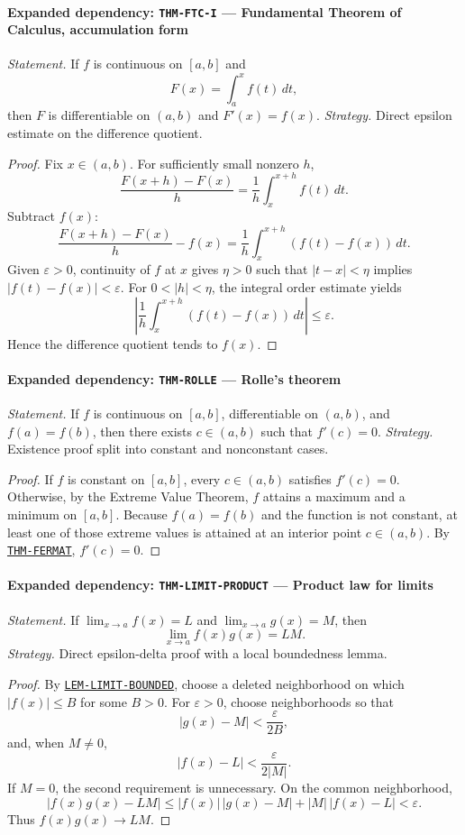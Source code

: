 \documentclass[10pt]{article}
\newcommand{\pidraw}[1]{\begingroup\urlstyle{tt}\nolinkurl{#1}\endgroup}
\newcommand{\pidref}[1]{\hyperref[prf:#1]{\pidraw{#1}}}
\newcommand{\pid}[1]{\pidref{#1}}
\theoremstyle{definition}
\theoremstyle{remark}
\begin{document}
\paragraph{Expanded dependency: \pidraw{THM-FTC-I} --- Fundamental Theorem of Calculus, accumulation form}
\textit{Statement.} If $f$ is continuous on $[a,b]$ and
\[
F(x)=\int_a^x f(t)\,dt,
\]
then $F$ is differentiable on $(a,b)$ and $F'(x)=f(x)$.
\textit{Strategy.} Direct epsilon estimate on the difference quotient.
\begin{proof}Fix $x\in(a,b)$. For sufficiently small nonzero $h$,
\[
\frac{F(x+h)-F(x)}{h}
=
\frac1h\int_x^{x+h}f(t)\,dt.
\]
Subtract $f(x)$:
\[
\frac{F(x+h)-F(x)}{h}-f(x)
=
\frac1h\int_x^{x+h}(f(t)-f(x))\,dt.
\]
Given $\varepsilon>0$, continuity of $f$ at $x$ gives $\eta>0$ such that
$|t-x|<\eta$ implies $|f(t)-f(x)|<\varepsilon$. For $0<|h|<\eta$, the
integral order estimate yields
\[
\left|
\frac1h\int_x^{x+h}(f(t)-f(x))\,dt
\right|
\le \varepsilon.
\]
Hence the difference quotient tends to $f(x)$.\end{proof}

\paragraph{Expanded dependency: \pidraw{THM-ROLLE} --- Rolle's theorem}
\textit{Statement.} If $f$ is continuous on $[a,b]$, differentiable on $(a,b)$, and $f(a)=f(b)$, then there exists $c\in(a,b)$ such that $f'(c)=0$.
\textit{Strategy.} Existence proof split into constant and nonconstant cases.
\begin{proof}If $f$ is constant on $[a,b]$, every $c\in(a,b)$ satisfies $f'(c)=0$.
Otherwise, by the Extreme Value Theorem, $f$ attains a maximum and a minimum
on $[a,b]$. Because $f(a)=f(b)$ and the function is not constant, at least one
of those extreme values is attained at an interior point $c\in(a,b)$.
By \pid{THM-FERMAT}, $f'(c)=0$.\end{proof}

\paragraph{Expanded dependency: \pidraw{THM-LIMIT-PRODUCT} --- Product law for limits}
\textit{Statement.} If $\lim_{x\to a}f(x)=L$ and $\lim_{x\to a}g(x)=M$, then
\[
\lim_{x\to a}f(x)g(x)=LM.
\]
\textit{Strategy.} Direct epsilon-delta proof with a local boundedness lemma.
\begin{proof}By \pid{LEM-LIMIT-BOUNDED}, choose a deleted neighborhood on which
$|f(x)|\le B$ for some $B>0$. For $\varepsilon>0$, choose neighborhoods so that
\[
|g(x)-M|<\frac{\varepsilon}{2B},
\]
and, when $M\ne0$,
\[
|f(x)-L|<\frac{\varepsilon}{2|M|}.
\]
If $M=0$, the second requirement is unnecessary. On the common neighborhood,
\[
|f(x)g(x)-LM|
\le |f(x)|\,|g(x)-M|+|M|\,|f(x)-L|<\varepsilon.
\]
Thus $f(x)g(x)\to LM$.\end{proof}
\end{document}

